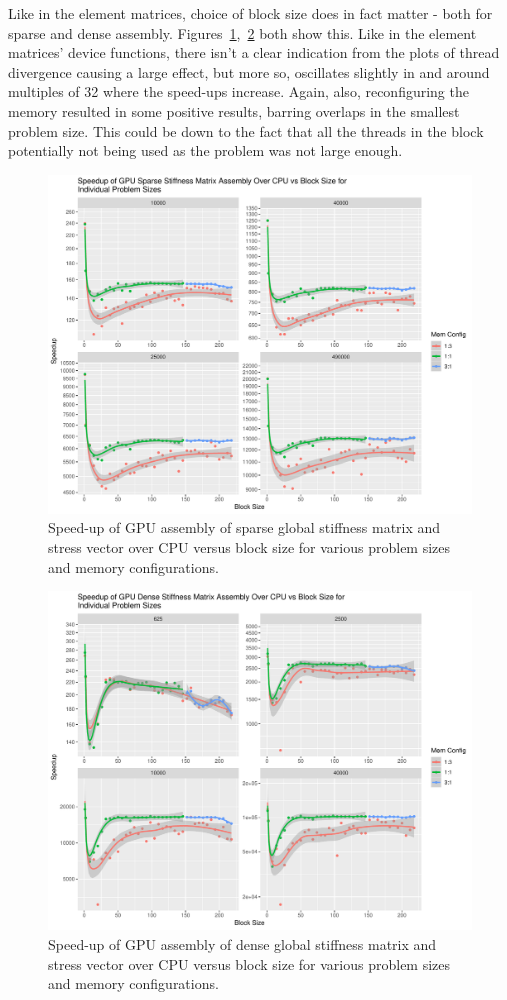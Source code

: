 Like in the element matrices, choice of block size does in fact matter - both for sparse and dense assembly. Figures~\ref{fig:assem_sparse_reconfig},~\ref{fig:assem_dense_reconfig} both show this. Like in the element matrices' device functions, there isn't a clear indication from the plots of thread divergence causing a large effect, but more so, oscillates slightly in and around multiples of 32 where the speed-ups increase. Again, also, reconfiguring the memory resulted in some positive results, barring overlaps in the smallest problem size. This could be down to the fact that all the threads in the block potentially not being used as the problem was not large enough.

\begin{figure}
	\centering
	\includegraphics[width=0.9\linewidth]{Plots/assem_dev_sparse_speedups_reconfig}
	\caption{Speed-up of GPU assembly of sparse global stiffness matrix and stress vector over CPU versus block size for various problem sizes and memory configurations.}
	\label{fig:assem_sparse_reconfig}
\end{figure}

\begin{figure}
	\centering
	\includegraphics[width=0.9\linewidth]{Plots/assem_dev_dense_speedups_reconfig}
	\caption{Speed-up of GPU assembly of dense global stiffness matrix and stress vector over CPU versus block size for various problem sizes and memory configurations.}
	\label{fig:assem_dense_reconfig}
\end{figure}


